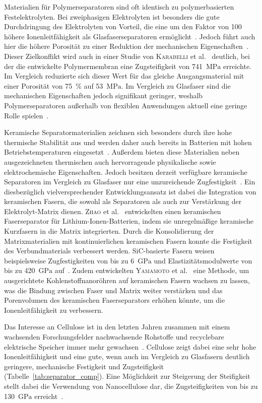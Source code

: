 Materialien für Polymerseparatoren sind oft identisch zu polymerbasierten Festelektrolyten. Bei zweiphasigen Elektrolyten ist besonders die gute Durchdringung des Elektrolyten von Vorteil, die eine um den Faktor von 100 höhere Ionenleitfähigkeit als Glasfaserseparatoren ermöglicht~\cite{Wang2021a}. Jedoch führt auch hier die höhere Porosität zu einer Reduktion der mechanischen Eigenschaften~\cite{Ahankari2022}. Dieser Zielkonflikt wird auch in einer Studie von \textsc{Karabelli} et al.~\cite{Karabelli2011} deutlich, bei der die entwickelte Polymermembran eine Zugsteifigkeit von 741~$\si{\MPa}$ erreichte. Im Vergleich reduzierte sich dieser Wert für das gleiche Ausgangsmaterial mit einer Porosität von 75~\% auf 53~$\si{\MPa}$. Im Vergleich zu Glasfaser sind die mechanischen Eigenschaften jedoch signifikant geringer, weshalb Polymerseparatoren außerhalb von flexiblen Anwendungen aktuell eine geringe Rolle spielen~\cite{Zschiebsch2024}.

Keramische Separatormaterialien zeichnen sich besonders durch ihre hohe thermische Stabilität aus und werden daher auch bereits in Batterien mit hohen Betriebstemperaturen eingesetzt~\cite{Qin2017,Cheong2012}. Außerdem bieten diese Materialien neben ausgezeichneten thermischen auch hervorragende physikalische sowie elektrochemische Eigenschaften. Jedoch besitzen derzeit verfügbare keramische Separatoren im Vergleich zu Glasfaser nur eine unzureichende Zugfestigkeit~\cite{Qin2017}. Ein diesbezüglich vielversprechender Entwicklungsansatz ist dabei die Integration von keramischen Fasern, die sowohl als Separatoren als auch zur Verstärkung der Elektrolyt-Matrix dienen. \textsc{Zhao} et al.~\cite{Zhao2017} entwickelten einen keramischen Faserseparator für Lithium-Ionen-Batterien, indem sie unregelmäßige keramische Kurzfasern in die Matrix integrierten. Durch die Konsolidierung der Matrixmaterialien mit kontinuierlichen keramischen Fasern konnte die Festigkeit des Verbundmaterials verbessert werden. SiC-basierte Fasern weisen beispielsweise Zugfestigkeiten von bis zu 6~$\si{\GPa}$ und Elastizitätsmodulwerte von bis zu 420~$\si{\GPa}$ auf~\cite{Seydibeyoglu2017}. Zudem entwickelten \textsc{Yamamoto} et al.~\cite{Yamamoto2009} eine Methode, um ausgerichtete Kohlenstoffnanoröhren auf keramischen Fasern wachsen zu lassen, was die Bindung zwischen Faser und Matrix weiter verstärken und das Porenvolumen des keramischen Faserseparators erhöhen könnte, um die Ionenleitfähigkeit zu verbessern.

Das Interesse an Cellulose ist in den letzten Jahren zusammen mit einem wachsenden Forschungsfelder nachwachsende Rohstoffe und recyclebare elektrische Speicher immer mehr gewachsen~\cite{Liang2018,Teng2020}. Cellulose zeigt dabei eine sehr hohe Ionenleitfähigkeit und eine gute, wenn auch im Vergleich zu Glasfasern deutlich geringere, mechanische Festigkeit und Zugsteifigkeit~\cite{Xu2020} (Tabelle~\ref{tab:separator_comp}). Eine Möglichkeit zur Steigerung der Steifigkeit stellt dabei die Verwendung von Nanocellulose dar, die Zugsteifigkeiten von bis zu 130~$\si{\GPa}$ erreicht~\cite{Dufresne2013,Zhang2019}.

